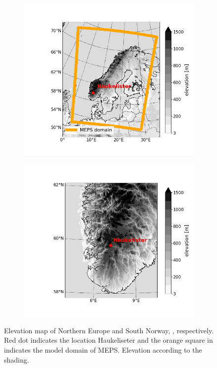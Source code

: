 \begin{figure}[t]
	\centering
    \begin{subfigure}[b]{0.49\textwidth}
    	\includegraphics[trim={2.75cm 1.8cm 4.4cm 2.3cm},clip,
        width=\textwidth]{./fig_Norway/Norway_MEPS}
        \caption{}\label{fig:site:Norway}
    \end{subfigure}
    \begin{subfigure}[b]{0.49\textwidth}
    	\includegraphics[trim={2.75cm 1.8cm .65cm 2.3cm},clip,
        width=\textwidth]{./fig_Norway/South_Norway}
    	\caption{}\label{fig:site:Nzoom}
    \end{subfigure}
   	\caption{Elevation map of Northern Europe and South Norway, ,  respectively. Red dot indicates the location Haukeliseter and the orange square in  indicates the model domain of MEPS. Elevation according to the shading.} \label{fig:site}
\end{figure}